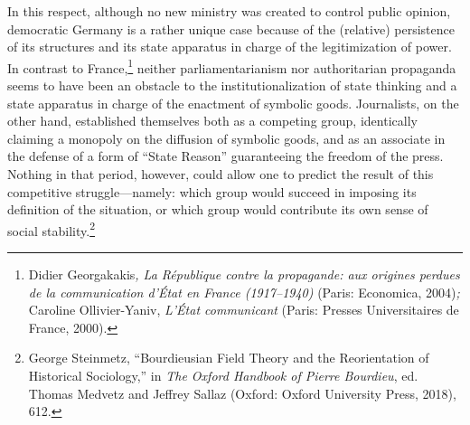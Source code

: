 \documentclass{tufte-handout}
\begin{document}
In this respect, although no new ministry was created to control public
opinion, democratic Germany is a rather unique case because of the
(relative) persistence of its structures and its state apparatus in
charge of the legitimization of power. In contrast to France,\footnote{Didier
  Georgakakis\emph{, La République contre la propagande: aux origines
  perdues de la communication d'État en France (1917--1940)} (Paris:
  Economica, 2004)\emph{;} Caroline Ollivier-Yaniv, \emph{L'État
  communicant} (Paris: Presses Universitaires de France, 2000).} neither
parliamentarianism nor authoritarian propaganda seems to have been an
obstacle to the institutionalization of state thinking and a state
apparatus in charge of the enactment of symbolic goods. Journalists, on
the other hand, established themselves both as a competing group,
identically claiming a monopoly on the diffusion of symbolic goods, and
as an associate in the defense of a form of ``State Reason''
guaranteeing the freedom of the press. Nothing in that period, however,
could allow one to predict the result of this competitive
struggle---namely: which group would succeed in imposing its definition
of the situation, or which group would contribute its own sense of
social stability.\footnote{George Steinmetz, ``Bourdieusian Field Theory
  and the Reorientation of Historical Sociology,'' in \emph{The Oxford
  Handbook of Pierre Bourdieu}, ed. Thomas Medvetz and Jeffrey Sallaz
  (Oxford: Oxford University Press, 2018), 612.}
\end{document}

